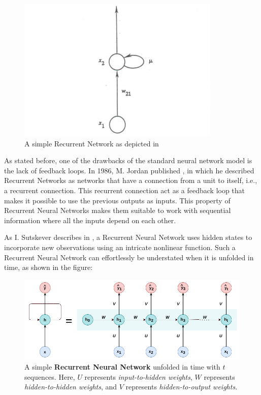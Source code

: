 \begin{figure}
    \centering
    \includegraphics[width=1.0\linewidth]{images/background/jordan_rnn.png}
    \caption[A simple Recurrent Network]{A simple Recurrent Network as depicted in \cite{jordan}}
    \label{fig:jordan_rnn}
\end{figure} 

As stated before, one of the drawbacks of the standard neural network model is the lack of feedback loops. In 1986, M. Jordan published \cite{jordan}, in which he described Recurrent Networks as networks that have a connection from a unit to itself, i.e., a recurrent connection. This recurrent connection act as a feedback loop that makes it possible to use the previous outputs as inputs. This property of Recurrent Neural Networks makes them suitable to work with sequential information where all the inputs depend on each other.

As I. Sutskever describes in \cite{ilya}, a Recurrent Neural Network uses hidden states to incorporate new observations using an intricate nonlinear function. Such a Recurrent Neural Network can effortlessly be understated when it is unfolded in time, as shown in the figure:

\begin{figure}[h]
	\centering
	\includegraphics[width=0.9\linewidth]{images/background/rnn.png}
	\caption[A Recurrent Neural Network unfolded in time]%
	{A simple \textbf{Recurrent Neural Network} unfolded in time with $t$ sequences. Here, $U$ represents \textit{input-to-hidden weights}, $W$ represents \textit{hidden-to-hidden weights}, and $V$ represents \textit{hidden-to-output weights}.}
	\label{fig:rnn}
\end{figure}

